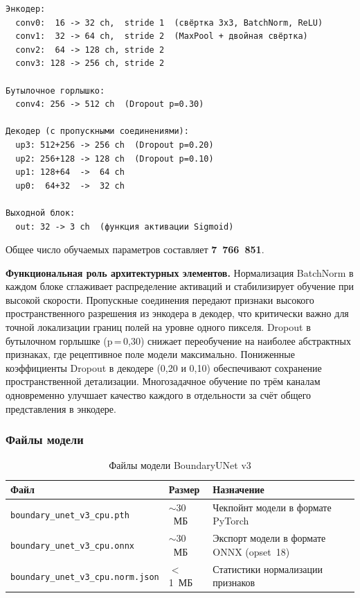 \documentclass[14pt,a4paper]{extarticle}
\newcommand{\tbl}[1]{\texttt{#1}}  %
\begin{document}
\begin{lstlisting}
Энкодер:
  conv0:  16 -> 32 ch,  stride 1  (свёртка 3x3, BatchNorm, ReLU)
  conv1:  32 -> 64 ch,  stride 2  (MaxPool + двойная свёртка)
  conv2:  64 -> 128 ch, stride 2
  conv3: 128 -> 256 ch, stride 2

Бутылочное горлышко:
  conv4: 256 -> 512 ch  (Dropout p=0.30)

Декодер (с пропускными соединениями):
  up3: 512+256 -> 256 ch  (Dropout p=0.20)
  up2: 256+128 -> 128 ch  (Dropout p=0.10)
  up1: 128+64  ->  64 ch
  up0:  64+32  ->  32 ch

Выходной блок:
  out: 32 -> 3 ch  (функция активации Sigmoid)
\end{lstlisting}

Общее число обучаемых параметров составляет \textbf{7~766~851}.

\textbf{Функциональная роль архитектурных элементов.}
Нормализация BatchNorm в каждом блоке сглаживает распределение активаций
и стабилизирует обучение при высокой скорости. Пропускные соединения
передают признаки высокого пространственного разрешения из энкодера
в декодер, что критически важно для точной локализации границ полей
на уровне одного пикселя. Dropout в бутылочном горлышке (p\,=\,0,30)
снижает переобучение на наиболее абстрактных признаках, где рецептивное
поле модели максимально. Пониженные коэффициенты Dropout в декодере
(0,20 и 0,10) обеспечивают сохранение пространственной детализации.
Многозадачное обучение по трём каналам одновременно улучшает качество
каждого в отдельности за счёт общего представления в энкодере.

\subsubsection{Файлы модели}

\begin{table}[h!]
\caption{Файлы модели BoundaryUNet v3}
\label{tab:model_files}
\begin{tabularx}{\textwidth}{L{68mm}L{16mm}X}
\toprule
\textbf{Файл} & \textbf{Размер} & \textbf{Назначение} \\
\midrule
\tbl{boundary\_unet\_v3\_cpu.pth}       & ${\sim}30$~МБ & Чекпойнт модели в формате PyTorch \\
\tbl{boundary\_unet\_v3\_cpu.onnx}      & ${\sim}30$~МБ & Экспорт модели в формате ONNX (opset~18) \\
\tbl{boundary\_unet\_v3\_cpu.norm.json} & $<$1~МБ       & Статистики нормализации признаков \\
\bottomrule
\end{tabularx}
\end{table}
\end{document}

